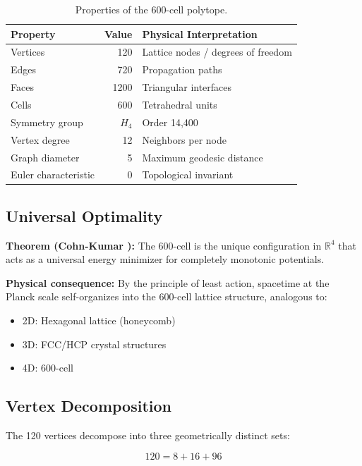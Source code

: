 \documentclass[12pt,a4paper]{article}
\begin{document}
\begin{table}[H]
\centering
\begin{tabular}{lrl}
\toprule
\textbf{Property} & \textbf{Value} & \textbf{Physical Interpretation} \\
\midrule
Vertices & 120 & Lattice nodes / degrees of freedom \\
Edges & 720 & Propagation paths \\
Faces & 1200 & Triangular interfaces \\
Cells & 600 & Tetrahedral units \\
Symmetry group & $H_4$ & Order 14,400 \\
Vertex degree & 12 & Neighbors per node \\
Graph diameter & 5 & Maximum geodesic distance \\
Euler characteristic & 0 & Topological invariant \\
\bottomrule
\end{tabular}
\caption{Properties of the 600-cell polytope.}
\end{table}

\subsection{Universal Optimality}

\textbf{Theorem (Cohn-Kumar \cite{cohn2007}):} The 600-cell is the unique configuration in $\mathbb{R}^4$ that acts as a universal energy minimizer for completely monotonic potentials.

\textbf{Physical consequence:} By the principle of least action, spacetime at the Planck scale self-organizes into the 600-cell lattice structure, analogous to:
\begin{itemize}
    \item 2D: Hexagonal lattice (honeycomb)
    \item 3D: FCC/HCP crystal structures
    \item 4D: 600-cell
\end{itemize}

\subsection{Vertex Decomposition}

The 120 vertices decompose into three geometrically distinct sets:

\begin{equation}
120 = 8 + 16 + 96
\end{equation}
\end{document}
